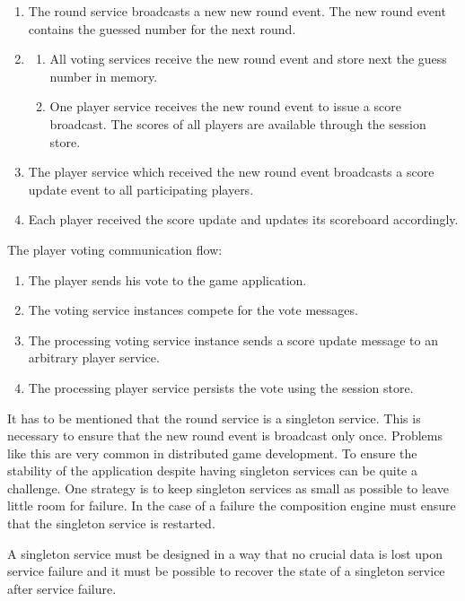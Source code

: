 \begin{enumerate}[label=\Alph*.]
  \item The round service broadcasts a new new round event. The new round event
  contains the guessed number for the next round.
  \item \begin{enumerate}[label=\arabic*.]
    \item All voting services receive the new round event and store next the
    guess number in memory.
  	\item One player service receives the new round event to issue a score
  	broadcast. The scores of all players are available through the session store.
  \end{enumerate}
  \item The player service which received the new round event broadcasts a score
  update event to all participating players.
  \item Each player received the score update and updates its scoreboard
  accordingly.
   
\end{enumerate}

The player voting communication flow:

\begin{enumerate}
  \item The player sends his vote to the game application.
  \item The voting service instances compete for the vote messages.
  \item The processing voting service instance sends a score update message to
  an arbitrary player service.
  \item The processing player service persists the vote using the session store.
\end{enumerate}

It has to be mentioned that the round service is a singleton service. This is
necessary to ensure that the new round event is broadcast only once. Problems
like this are very common in distributed game development. To ensure the
stability of the application despite having singleton services can be quite a
challenge. One strategy is to keep singleton services as small as possible to
leave little room for failure. In the case of a failure the composition engine
must ensure that the singleton service is restarted. 

A singleton service must be designed in a way that no crucial data is lost upon
service failure and it must be possible to recover the state of a singleton
service after service failure.



